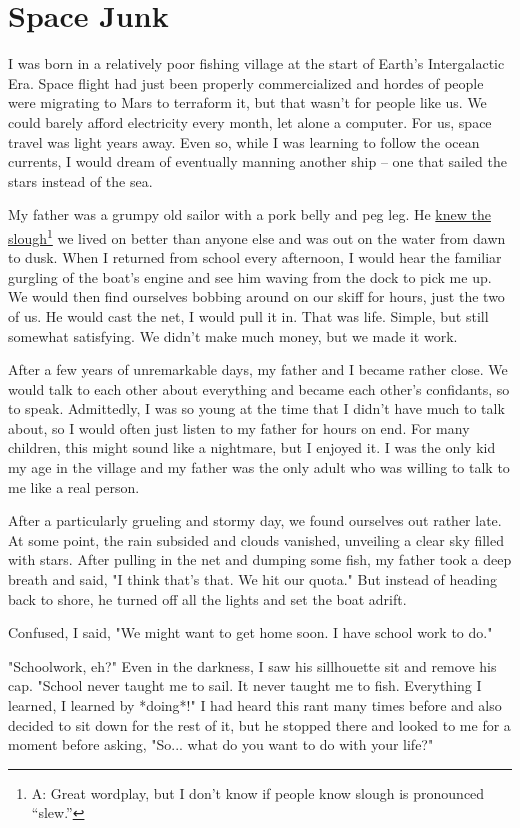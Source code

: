 \chapter{Space Junk}

I was born in a relatively poor fishing village at the start of Earth's Intergalactic Era.
Space flight had just been properly commercialized and hordes of people were migrating to Mars to terraform it, but that wasn't for people like us.
We could barely afford electricity every month, let alone a computer.
For us, space travel was light years away.
Even so, while I was learning to follow the ocean currents, I would dream of eventually manning another ship -- one that sailed the stars instead of the sea.

My father was a grumpy old sailor with a pork belly and peg leg.
He \underline{knew the slough}\footnote{A: Great wordplay, but I don't know if people know slough is pronounced ``slew.''} we lived on better than anyone else and was out on the water from dawn to dusk.
When I returned from school every afternoon, I would hear the familiar gurgling of the boat's engine and see him waving from the dock to pick me up.
We would then find ourselves bobbing around on our skiff for hours, just the two of us.
He would cast the net, I would pull it in.
That was life.
Simple, but still somewhat satisfying.
We didn't make much money, but we made it work.

After a few years of unremarkable days, my father and I became rather close.
We would talk to each other about everything and became each other's confidants, so to speak.
Admittedly, I was so young at the time that I didn't have much to talk about, so I would often just listen to my father for hours on end.
For many children, this might sound like a nightmare, but I enjoyed it.
I was the only kid my age in the village and my father was the only adult who was willing to talk to me like a real person.

After a particularly grueling and stormy day, we found ourselves out rather late.
At some point, the rain subsided and clouds vanished, unveiling a clear sky filled with stars.
After pulling in the net and dumping some fish, my father took a deep breath and said, "I think that's that. We hit our quota."
But instead of heading back to shore, he turned off all the lights and set the boat adrift.

Confused, I said, "We might want to get home soon. I have school work to do."

"Schoolwork, eh?"
Even in the darkness, I saw his sillhouette sit and remove his cap.
"School never taught me to sail. It never taught me to fish. Everything I learned, I learned by *doing*!"
I had heard this rant many times before and also decided to sit down for the rest of it, but he stopped there and looked to me for a moment before asking, "So... what do you want to do with your life?"

